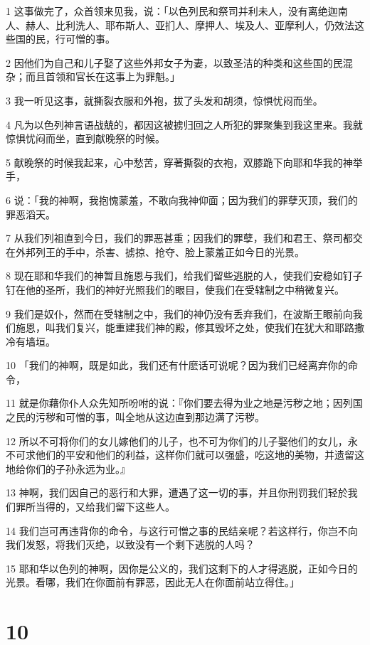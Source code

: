\par 1 这事做完了，众首领来见我，说：「以色列民和祭司并利未人，没有离绝迦南人、赫人、比利洗人、耶布斯人、亚扪人、摩押人、埃及人、亚摩利人，仍效法这些国的民，行可憎的事。
\par 2 因他们为自己和儿子娶了这些外邦女子为妻，以致圣洁的种类和这些国的民混杂；而且首领和官长在这事上为罪魁。」
\par 3 我一听见这事，就撕裂衣服和外袍，拔了头发和胡须，惊惧忧闷而坐。
\par 4 凡为以色列神言语战兢的，都因这被掳归回之人所犯的罪聚集到我这里来。我就惊惧忧闷而坐，直到献晚祭的时候。
\par 5 献晚祭的时候我起来，心中愁苦，穿著撕裂的衣袍，双膝跪下向耶和华我的神举手，
\par 6 说：「我的神啊，我抱愧蒙羞，不敢向我神仰面；因为我们的罪孽灭顶，我们的罪恶滔天。
\par 7 从我们列祖直到今日，我们的罪恶甚重；因我们的罪孽，我们和君王、祭司都交在外邦列王的手中，杀害、掳掠、抢夺、脸上蒙羞正如今日的光景。
\par 8 现在耶和华我们的神暂且施恩与我们，给我们留些逃脱的人，使我们安稳如钉子钉在他的圣所，我们的神好光照我们的眼目，使我们在受辖制之中稍微复兴。
\par 9 我们是奴仆，然而在受辖制之中，我们的神仍没有丢弃我们，在波斯王眼前向我们施恩，叫我们复兴，能重建我们神的殿，修其毁坏之处，使我们在犹大和耶路撒冷有墙垣。
\par 10 「我们的神啊，既是如此，我们还有什麽话可说呢？因为我们已经离弃你的命令，
\par 11 就是你藉你仆人众先知所吩咐的说：『你们要去得为业之地是污秽之地；因列国之民的污秽和可憎的事，叫全地从这边直到那边满了污秽。
\par 12 所以不可将你们的女儿嫁他们的儿子，也不可为你们的儿子娶他们的女儿，永不可求他们的平安和他们的利益，这样你们就可以强盛，吃这地的美物，并遗留这地给你们的子孙永远为业。』
\par 13 神啊，我们因自己的恶行和大罪，遭遇了这一切的事，并且你刑罚我们轻於我们罪所当得的，又给我们留下这些人。
\par 14 我们岂可再违背你的命令，与这行可憎之事的民结亲呢？若这样行，你岂不向我们发怒，将我们灭绝，以致没有一个剩下逃脱的人吗？
\par 15 耶和华以色列的神啊，因你是公义的，我们这剩下的人才得逃脱，正如今日的光景。看哪，我们在你面前有罪恶，因此无人在你面前站立得住。」

\chapter{10}

